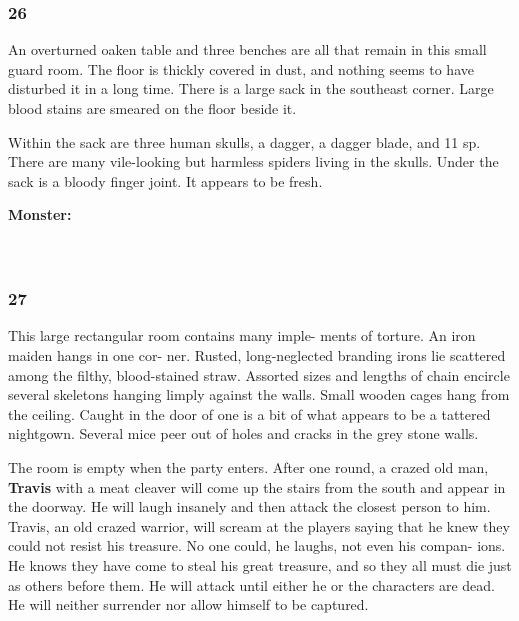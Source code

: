 \documentclass[palace_of_the_silver_princess]{subfiles}
\begin{document}
\subsubsection{26}
\begin{quotebox}
    An overturned oaken table and three benches are all that remain in
    this small guard room. The floor is thickly covered in dust, and
    nothing seems to have disturbed it in a long time. There is a large
    sack in the southeast corner. Large blood stains are smeared on the
    floor beside it.
\end{quotebox}

Within the sack are three human skulls, a dagger, a dagger blade, and 11
sp. There are many vile-looking but harmless spiders living in the
skulls. Under the sack is a bloody finger joint. It appears to be fresh.

\textbf{Monster:}
\\
\\
\\

\subsubsection{27}
\begin{quotebox}
    This large rectangular room contains many imple- ments of torture.
    An iron maiden hangs in one cor- ner. Rusted, long-neglected
    branding irons lie scattered among the filthy, blood-stained straw.
    Assorted sizes and lengths of chain encircle several skeletons
    hanging limply against the walls. Small wooden cages hang from the
    ceiling. Caught in the door of one is a bit of what appears to be a
    tattered nightgown. Several mice peer out of holes and cracks in the
    grey stone walls.
\end{quotebox}

The room is empty when the party enters. After one round, a crazed old
man, \textbf{Travis} with a meat cleaver will come up the stairs from
the south and appear in the doorway. He will laugh insanely and then
attack the closest person to him. Travis, an old crazed warrior, will
scream at the players saying that he knew they could not resist his
treasure. No one could, he laughs, not even his compan- ions. He knows
they have come to steal his great treasure, and so they all must die
just as others before them. He will attack until either he or the
characters are dead. He will neither surrender nor allow himself to be
captured.
\end{document}
